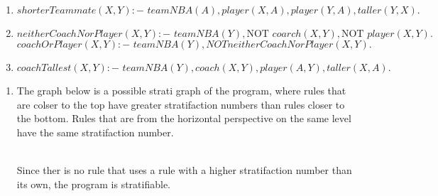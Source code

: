 \begin{exercise}{8}

  \begin{subexercise}
    \begin{enumerate}
      \item $shorterTeammate(X,Y):-\,\, teamNBA(A), player(X,A), player(Y,A), taller(Y,X). $
      \item $neitherCoachNorPlayer(X,Y):-\,\, teamNBA(Y), \text{NOT } coarch(X,Y),
            \text{NOT } player(X,Y).$ \\
            $coachOrPlayer(X,Y):-\,\, teamNBA(Y), NOT neitherCoachNorPlayer(X,Y). $
      \item $coachTallest(X,Y):-\,\, teamNBA(Y), coach(X,Y), player(A,Y), taller(X,A). $
    \end{enumerate}
  \end{subexercise}
  
  \begin{subexercise}
    \begin{enumerate}
      \item
        The graph below is a possible strati graph of the program, where rules
        that are colser to the top have greater stratifaction numbers than rules
        closer to the bottom. Rules that are from the horizontal perspective on
        the same level have the same stratifaction number. \\
        \\
        Since ther is no rule that uses a rule with a higher stratifaction
        number than its own, the program is stratifiable.


\end{enumerate}
\end{subexercise}
\end{exercise}
